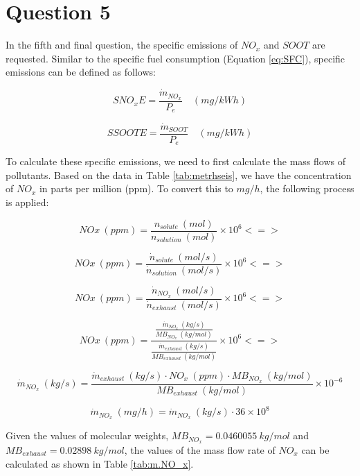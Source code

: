 \documentclass{report}
\begin{document}
\section{Question 5}

In the fifth and final question, the specific emissions of $NO_x$ and $SOOT$ are requested. Similar to the specific fuel consumption (Equation \ref{eq:SFC}), specific emissions can be defined as follows:

\begin{equation}
    \label{eq:SNOxE}
    SNO_xE=\frac{\dot{m}_{NO_x}}{P_e}\quad (mg/kWh)
\end{equation}

\begin{equation}
    \label{eq:SSOOTE}
    SSOOTE=\frac{\dot{m}_{SOOT}}{P_e}\quad (mg/kWh)
\end{equation}

To calculate these specific emissions, we need to first calculate the mass flows of pollutants. Based on the data in Table \ref{tab:metrhseis}, we have the concentration of $NO_x$ in parts per million (ppm). To convert this to $mg/h$, the following process is applied:

$$NOx\:(ppm)=\frac{n_{solute}\: (mol)}{n_{solution}\: (mol)}\times 10^6<=>$$

$$NOx\:(ppm)=\frac{\dot{n}_{solute}\: (mol/s)}{\dot{n}_{solution}\: (mol/s)}\times 10^6<=>$$

$$NOx\:(ppm)=\frac{\dot{n}_{NO_x}\: (mol/s)}{\dot{n}_{exhaust}\: (mol/s)}\times 10^6<=>$$

$$NOx\:(ppm)=\frac{\frac{\dot{m}_{NO_x}\: (kg/s)}{MB_{NO_x}\: (kg/mol)}}{\frac{\dot{m}_{exhaust}\: (kg/s)}{MB_{exhaust}\: (kg/mol)}}\times 10^6<=>$$

\begin{equation}
    \label{eq:m.NOx}
   \dot{m}_{NO_x}\: (kg/s)=\frac{\dot{m}_{exhaust}\: (kg/s)\cdot NO_x\:(ppm)\cdot MB_{NO_x}\: (kg/mol)}{MB_{exhaust}\: (kg/mol)}\times 10^{-6} 
\end{equation}

\begin{equation}
    \label{eq:m.NOx2}
   \dot{m}_{NO_x}\: (mg/h)= \dot{m}_{NO_x}\: (kg/s) \cdot 36\times 10^8
\end{equation}

Given the values of molecular weights, $MB_{NO_x}=0.0460055 \: kg/mol$ and $MB_{exhaust}=0.02898 \: kg/mol$, the values of the mass flow rate of $NO_x$ can be calculated as shown in Table \ref{tab:m.NO_x}.
\end{document}

